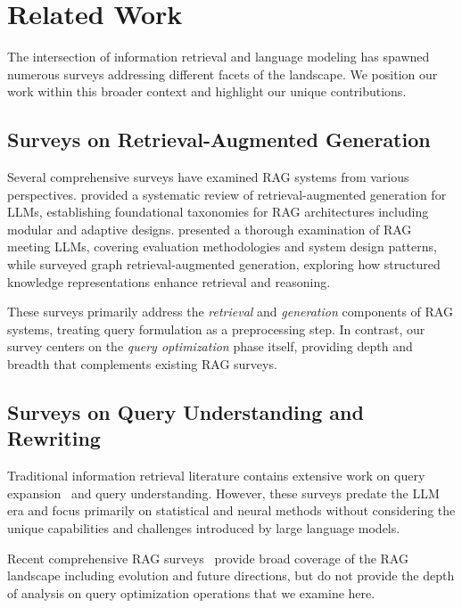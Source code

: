 \documentclass{article}
\begin{document}
\section{Related Work}\label{sec:related}

The intersection of information retrieval and language modeling has spawned numerous surveys addressing different facets of the landscape. We position our work within this broader context and highlight our unique contributions.

\subsection{Surveys on Retrieval-Augmented Generation}

Several comprehensive surveys have examined RAG systems from various perspectives. \citet{survey2} provided a systematic review of retrieval-augmented generation for LLMs, establishing foundational taxonomies for RAG architectures including modular and adaptive designs. \citet{survey8} presented a thorough examination of RAG meeting LLMs, covering evaluation methodologies and system design patterns, while \citet{survey10} surveyed graph retrieval-augmented generation, exploring how structured knowledge representations enhance retrieval and reasoning.

These surveys primarily address the \textit{retrieval} and \textit{generation} components of RAG systems, treating query formulation as a preprocessing step. In contrast, our survey centers on the \textit{query optimization} phase itself, providing depth and breadth that complements existing RAG surveys.

\subsection{Surveys on Query Understanding and Rewriting}

Traditional information retrieval literature contains extensive work on query expansion~\citep{query_expansion_survey1,query_expansion_survey2} and query understanding. However, these surveys predate the LLM era and focus primarily on statistical and neural methods without considering the unique capabilities and challenges introduced by large language models.

Recent comprehensive RAG surveys~\citep{survey11} provide broad coverage of the RAG landscape including evolution and future directions, but do not provide the depth of analysis on query optimization operations that we examine here.
\end{document}
